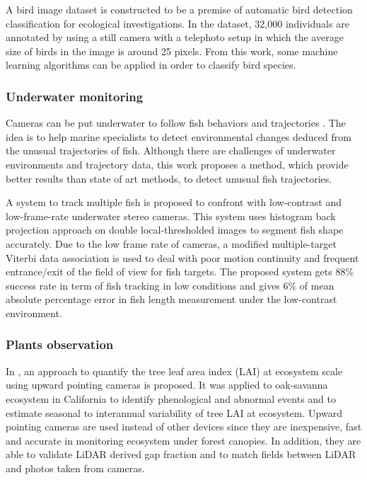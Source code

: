 \documentclass[10pt,a4paper]{article}
\begin{document}
A bird image dataset is constructed to be a premise of automatic bird detection classification \cite{Naemura7351607} for ecological investigations. In the dataset, 32,000 individuals are annotated by using a still camera with a telephoto setup in which the average size of birds in the image is around 25 pixels. From this work, some machine learning algorithms can be applied in order to classify bird species.

\subsubsection {Underwater monitoring}

Cameras can be put underwater to follow fish behaviors and trajectories \cite{Beyan2016}. The idea is to help marine specialists 
to detect environmental changes deduced from the unusual trajectories of fish. 
Although there are  challenges of underwater environments and trajectory data,  this work proposes a method, which provide better results than state of art methods, to detect unusual fish trajectories.

A system to track multiple fish \cite{Underwater6898002} is proposed to confront with low-contrast and low-frame-rate underwater stereo cameras. This system uses histogram back projection approach on double local-thresholded images to segment fish shape accurately. Due to the low frame rate of cameras, a modified multiple-target Viterbi data association is used to deal with poor motion continuity and frequent entrance/exit of the field of view for fish targets. The proposed system gets 88\% success rate in term of fish tracking in low conditions and gives 6\% of mean absolute percentage error in fish length measurement under the low-contrast environment.  

\subsubsection {Plants observation}

In \cite{Ryu2012116}, an approach  to quantify the tree leaf area index (LAI) at ecosystem scale using upward pointing cameras is proposed. It was applied to oak-savanna ecosystem in California to identify phenological and abnormal events and to estimate seasonal to interannual variability of tree LAI at ecosystem. Upward pointing cameras are used instead of other devices since they are inexpensive, fast and accurate in monitoring ecosystem under forest canopies. In addition, they are able to validate LiDAR derived gap fraction and to match fields between LiDAR and photos taken from cameras.
\end{document}
